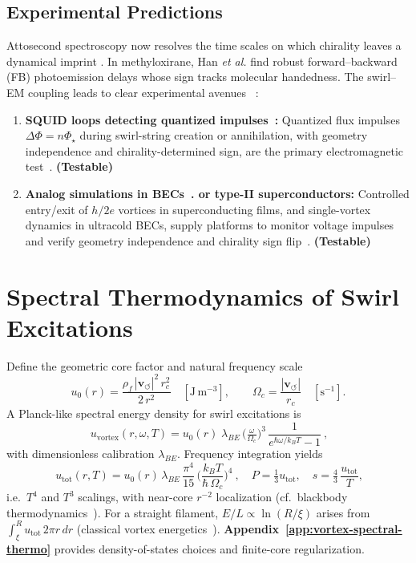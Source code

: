 \documentclass[10pt,reprint,aps,onecolumn,nofootinbib]{revtex4-2}
\newcommand{\testable}{\textbf{(Testable)}}
\begin{document}
    \subsection*{Experimental Predictions}
        Attosecond spectroscopy now resolves the time scales on which chirality leaves a dynamical imprint \cite{Krausz2009,Beaulieu2018}. In methyloxirane, Han \emph{et al.} \cite{Han2025} find robust forward–backward (FB) photoemission delays whose sign tracks molecular handedness.
        The swirl–EM coupling leads to clear experimental avenues~ \cite{EM_G}:
        \begin{enumerate}
        \item \textbf{SQUID loops detecting quantized impulses~\cite{sstAttosecondPhotoionization,DeaverFairbank1961,DollNäbauer1961,ClarkeBraginski2011}:} Quantized flux impulses $\Delta\Phi=n\Phi_\star$ during swirl-string creation or annihilation, with geometry independence and chirality-determined sign, are the primary electromagnetic test~\cite{EM_G}. \testable
        \item \textbf{Analog simulations in BECs~\cite{BarceloLiberatiVisser2011,SchererWeilerNeelyAnderson2007}. or type-II superconductors:} Controlled entry/exit of $h/2e$ vortices in superconducting films, and single-vortex dynamics in ultracold BECs, supply platforms to monitor voltage impulses and verify geometry independence and chirality sign flip~\cite{EM_G}. \testable
        \end{enumerate}

\section{Spectral Thermodynamics of Swirl Excitations}\label{sec:spectral-thermo}
    Define the geometric core factor and natural frequency scale
    \[
        u_0(r)=\frac{\rho_{\!f}\,|\mathbf{v}_{\!\boldsymbol{\circlearrowleft}}|^{2}\,r_c^{2}}{2\,r^{2}}
        \quad [\mathrm{J\,m^{-3}}],\qquad
        \Omega_c=\frac{|\mathbf{v}_{\!\boldsymbol{\circlearrowleft}}|}{r_c}\quad [\mathrm{s^{-1}}].
    \]
    A Planck-like spectral energy density for swirl excitations is
    \[
        \boxed{~
        u_{\mathrm{vortex}}(r,\omega,T)=u_0(r)\;\lambda_{\!BE}\,
        \Big(\tfrac{\omega}{\Omega_c}\Big)^{3}\,
        \frac{1}{e^{\hbar\omega/k_B T}-1}
        ~},
    \]
    with dimensionless calibration \(\lambda_{\!BE}\). Frequency integration yields
    \[
        \boxed{~
        u_{\mathrm{tot}}(r,T)=u_0(r)\,\lambda_{\!BE}\,\frac{\pi^{4}}{15}\,
        \Big(\frac{k_B T}{\hbar\,\Omega_c}\Big)^{\!4}
            ~},\quad
        P=\tfrac{1}{3}u_{\mathrm{tot}},\quad
        s=\tfrac{4}{3}\,\frac{u_{\mathrm{tot}}}{T},
    \]
    i.e.\ \(T^4\) and \(T^3\) scalings, with near-core \(r^{-2}\) localization (cf.\ blackbody thermodynamics~\cite{Planck1901,LandauFM}).
    For a straight filament, \(E/L \propto \ln(R/\xi)\) arises from \(\int_\xi^R u_{\mathrm{tot}}\,2\pi r\,dr\) (classical vortex energetics~\cite{Saffman1992}).
    \textbf{Appendix~\ref{app:vortex-spectral-thermo}} provides density-of-states choices and finite-core regularization.
\end{document}
